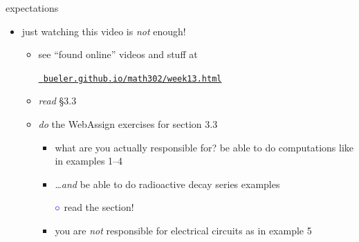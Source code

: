 \documentclass[urlcolor=blue,dvipsnames]{beamer}
\begin{document}
\begin{frame}{expectations}

\begin{itemize}
\item just watching this video is \emph{not} enough!
     \begin{itemize}
     \item see ``found online'' videos and stuff at

     \centerline{\href{https://bueler.github.io/math302/week13.html}{\tt \color{cyan} bueler.github.io/math302/week13.html}}
     \item \emph{read} \S3.3
     \item \emph{do} the WebAssign exercises for section 3.3
         \begin{itemize}
         \item what are you actually responsible for?  \alert{be able to do computations like in examples 1--4}
         \item \dots \emph{and} be able to do radioactive decay series examples

             \hspace{4mm} ${\color{blue} \circ}$ read the section!
         \item you are \emph{not} responsible for electrical circuits as in example 5
         \end{itemize}
     \end{itemize}
\end{itemize}
\end{frame}
\end{document}
